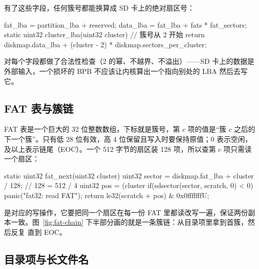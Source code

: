有了这些字段，任何簇号都能换算成 SD 卡上的绝对扇区号：

\begin{ccode}
fat_lba  = partition_lba + reserved;
data_lba = fat_lba + fats * fat_sectors;
static uint32 cluster_lba(uint32 cluster) {     // 簇号从 2 开始
  return diskmap.data_lba + (cluster - 2) * diskmap.sectors_per_cluster;
}
\end{ccode}

 对每个字段都做了合法性检查（2 的幂、不越界、不溢出）——SD 卡上的数据是外部输入，一个损坏的 BPB 不应该让内核算出一个指向别处的 LBA 然后去写它。

\subsection{FAT 表与簇链}

FAT 表是一个巨大的 32 位整数数组，下标就是簇号，第 $c$ 项的值是“簇 $c$ 之后的下一个簇”。只有低 28 位有效，高 4 位保留且写入时要保持原值；0 表示空闲， 及以上表示链尾（EOC）。一个 512 字节的扇区装 128 项，所以查第 $c$ 项只需读一个扇区：

\begin{ccode}
static uint32 fat_next(uint32 cluster) {
  uint32 sector = diskmap.fat_lba + cluster / 128;   // 128 = 512 / 4
  uint32 pos    = (cluster %
  if(sdsector(sector, scratch, 0) < 0) panic("fat32: read FAT");
  return le32(scratch + pos) & 0x0fffffffU;
}
\end{ccode}

 是对应的写操作，它要把同一个扇区在每一份 FAT 里都读改写一遍，保证两份副本一致。图~\ref{fig:fat-chain} 下半部分画的就是一条簇链：从目录项里拿到首簇，然后反复  直到 EOC。

\subsection{目录项与长文件名}

